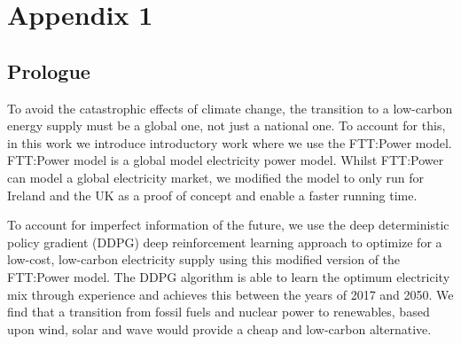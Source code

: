 \chapter{Appendix 1} 

\section{Prologue}
	
%	

To avoid the catastrophic effects of climate change, the transition to a low-carbon energy supply must be a global one, not just a national one. To account for this, in this work we introduce introductory work where we use the FTT:Power model. FTT:Power model is a global model electricity power model. Whilst FTT:Power can model a global electricity market, we modified the model to only run for Ireland and the UK as a proof of concept and enable a faster running time.

To account for imperfect information of the future, we use the deep deterministic policy gradient (DDPG) deep reinforcement learning approach to optimize for a low-cost, low-carbon electricity supply using this modified version of the FTT:Power model. The DDPG algorithm is able to learn the optimum electricity mix through experience and achieves this between the years of 2017 and 2050. We find that a transition from fossil fuels and nuclear power to renewables, based upon wind, solar and wave would provide a cheap and low-carbon alternative.
	




